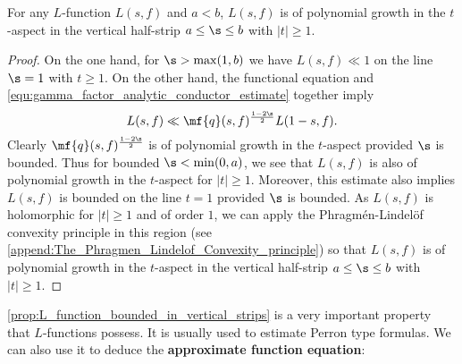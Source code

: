     \begin{proposition}\label{prop:L_function_bounded_in_vertical_strips}
      For any $L$-function $L(s,f)$ and $a < b$, $L(s,f)$ is of polynomial growth in the $t$-aspect in the vertical half-strip $a \le \s \le b$ with $|t| \ge 1$.
    \end{proposition}
    \begin{proof}
      On the one hand, for $\s > \max(1,b)$ we have $L(s,f) \ll 1$ on the line $\s = 1$ with $t \ge 1$. On the other hand, the functional equation and \cref{equ:gamma_factor_analytic_conductor_estimate} together imply
      \[
        L(s,f) \ll \mf{q}(s,f)^{\frac{1-2\s}{2}}L(1-s,f).
      \]
      Clearly $\mf{q}(s,f)^{\frac{1-2\s}{2}}$ is of polynomial growth in the $t$-aspect provided $\s$ is bounded. Thus for bounded $\s < \min(0,a)$, we see that $L(s,f)$ is also of polynomial growth in the $t$-aspect for $|t| \ge 1$. Moreover, this estimate also implies $L(s,f)$ is bounded on the line $t = 1$ provided $\s$ is bounded. As $L(s,f)$ is holomorphic for $|t| \ge 1$ and of order $1$, we can apply the Phragm\'en-Lindel\"of convexity principle in this region (see \cref{append:The_Phragmen_Lindelof_Convexity_principle}) so that $L(s,f)$ is of polynomial growth in the $t$-aspect in the vertical half-strip $a \le \s \le b$ with $|t| \ge 1$.
    \end{proof}

    \cref{prop:L_function_bounded_in_vertical_strips} is a very important property that $L$-functions possess. It is usually used to estimate Perron type formulas. We can also use it to deduce the \textbf{approximate function equation}:

